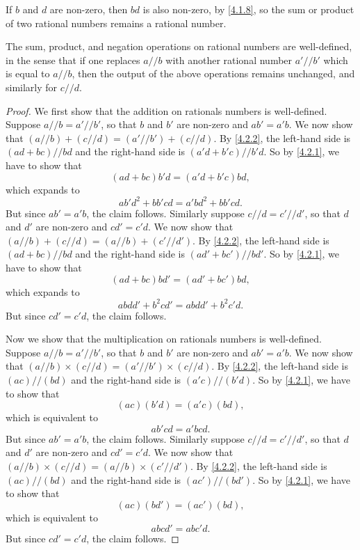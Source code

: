 \begin{note}
  If \(b\) and \(d\) are non-zero, then \(bd\) is also non-zero, by \cref{4.1.8}, so the sum or product of two rational numbers remains a rational number.
\end{note}

\begin{lemma}\label{4.2.3}
  The sum, product, and negation operations on rational numbers are well-defined, in the sense that if one replaces \(a // b\) with another rational number \(a' // b'\) which is equal to \(a // b\), then the output of the above operations remains unchanged, and similarly for \(c // d\).
\end{lemma}

\begin{proof}
  We first show that the addition on rationals numbers is well-defined.
  Suppose \(a // b = a' // b'\), so that \(b\) and \(b'\) are non-zero and \(ab' = a'b\).
  We now show that \((a // b) + (c // d) = (a' // b') + (c // d)\).
  By \cref{4.2.2}, the left-hand side is \((ad + bc) // bd\) and the right-hand side is \((a'd + b'c) // b'd\).
  So by \cref{4.2.1}, we have to show that
  \[
    (ad + bc)b'd = (a'd + b'c)bd,
  \]
  which expands to
  \[
    ab'd^2 + bb'cd = a'bd^2 + bb'cd.
  \]
  But since \(ab' = a'b\), the claim follows.
  Similarly suppose \(c // d = c' // d'\), so that \(d\) and \(d'\) are non-zero and \(cd' = c'd\).
  We now show that \((a // b) + (c // d) = (a // b) + (c' // d')\).
  By \cref{4.2.2}, the left-hand side is \((ad + bc) // bd\) and the right-hand side is \((ad' + bc') // bd'\).
  So by \cref{4.2.1}, we have to show that
  \[
    (ad + bc)bd' = (ad' + bc')bd,
  \]
  which expands to
  \[
    abdd' + b^2cd' = abdd' + b^2c'd.
  \]
  But since \(cd' = c'd\), the claim follows.

  Now we show that the multiplication on rationals numbers is well-defined.
  Suppose \(a // b = a' // b'\), so that \(b\) and \(b'\) are non-zero and \(ab' = a'b\).
  We now show that \((a // b) \times (c // d) = (a' // b') \times (c // d)\).
  By \cref{4.2.2}, the left-hand side is \((ac) // (bd)\) and the right-hand side is \((a'c) // (b'd)\).
  So by \cref{4.2.1}, we have to show that
  \[
    (ac)(b'd) = (a'c)(bd),
  \]
  which is equivalent to
  \[
    ab'cd = a'bcd.
  \]
  But since \(ab' = a'b\), the claim follows.
  Similarly suppose \(c // d = c' // d'\), so that \(d\) and \(d'\) are non-zero and \(cd' = c'd\).
  We now show that \((a // b) \times (c // d) = (a // b) \times (c' // d')\).
  By \cref{4.2.2}, the left-hand side is \((ac) // (bd)\) and the right-hand side is \((ac') // (bd')\).
  So by \cref{4.2.1}, we have to show that
  \[
    (ac)(bd') = (ac')(bd),
  \]
  which is equivalent to
  \[
    abcd' = abc'd.
  \]
  But since \(cd' = c'd\), the claim follows.


\end{proof}
